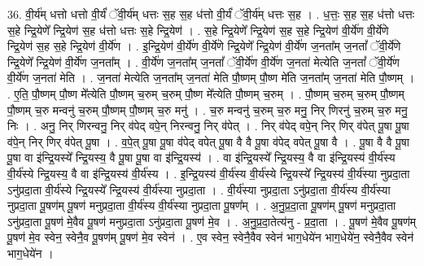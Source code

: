 \documentclass[17pt]{extarticle}
\begin{document}
36. वी॒र्य॑म् धत्तो धत्तो वी॒र्यं॑ ॅवी॒र्य॑म् धत्तः स॒ह स॒ह ध॑त्तो वी॒र्यं॑ ॅवी॒र्य॑म् धत्तः स॒ह । . ध॒त्तः॒ स॒ह स॒ह ध॑त्तो धत्तः स॒हे न्द्रि॒येणे᳚ न्द्रि॒येण॑ स॒ह ध॑त्तो धत्तः स॒हे न्द्रि॒येण॑ । . स॒हे न्द्रि॒येणे᳚ न्द्रि॒येण॑ स॒ह स॒हे न्द्रि॒येण॑ वी॒र्ये॑ण वी॒र्ये॑णे न्द्रि॒येण॑ स॒ह स॒हे न्द्रि॒येण॑ वी॒र्ये॑ण । . इ॒न्द्रि॒येण॑ वी॒र्ये॑ण वी॒र्ये॑णे न्द्रि॒येणे᳚ न्द्रि॒येण॑ वी॒र्ये॑ण ज॒नता᳚म् ज॒नतां᳚ ॅवी॒र्ये॑णे न्द्रि॒येणे᳚ न्द्रि॒येण॑ वी॒र्ये॑ण ज॒नता᳚म् । . वी॒र्ये॑ण ज॒नता᳚म् ज॒नतां᳚ ॅवी॒र्ये॑ण वी॒र्ये॑ण ज॒नता॑ मेत्येति ज॒नतां᳚ ॅवी॒र्ये॑ण वी॒र्ये॑ण ज॒नता॑ मेति । . ज॒नता॑ मेत्येति ज॒नता᳚म् ज॒नता॑ मेति पौ॒ष्णम् पौ॒ष्ण मे॑ति ज॒नता᳚म् ज॒नता॑ मेति पौ॒ष्णम् । . ए॒ति॒ पौ॒ष्णम् पौ॒ष्ण मे᳚त्येति पौ॒ष्णम् च॒रुम् च॒रुम् पौ॒ष्ण मे᳚त्येति पौ॒ष्णम् च॒रुम् । . पौ॒ष्णम् च॒रुम् च॒रुम् पौ॒ष्णम् पौ॒ष्णम् च॒रु मन्वनु॑ च॒रुम् पौ॒ष्णम् पौ॒ष्णम् च॒रु मनु॑ । . च॒रु मन्वनु॑ च॒रुम् च॒रु मनु॒ निर् णिरनु॑ च॒रुम् च॒रु मनु॒ निः । . अनु॒ निर् णिरन्वनु॒ निर् व॑पेद् वपे॒न् निरन्वनु॒ निर् व॑पेत् । . निर् व॑पेद् वपे॒न् निर् णिर् व॑पेत् पू॒षा पू॒षा व॑पे॒न् निर् णिर् व॑पेत् पू॒षा । . व॒पे॒त् पू॒षा पू॒षा व॑पेद् वपेत् पू॒षा वै वै पू॒षा व॑पेद् वपेत् पू॒षा वै । . पू॒षा वै वै पू॒षा पू॒षा वा इ॑न्द्रि॒यस्ये᳚ न्द्रि॒यस्य॒ वै पू॒षा पू॒षा वा इ॑न्द्रि॒यस्य॑ । . वा इ॑न्द्रि॒यस्ये᳚ न्द्रि॒यस्य॒ वै वा इ॑न्द्रि॒यस्य॑ वी॒र्य॑स्य वी॒र्य॑स्ये न्द्रि॒यस्य॒ वै वा इ॑न्द्रि॒यस्य॑ वी॒र्य॑स्य । . इ॒न्द्रि॒यस्य॑ वी॒र्य॑स्य वी॒र्य॑स्ये न्द्रि॒यस्ये᳚ न्द्रि॒यस्य॑ वी॒र्य॑स्या नुप्रदा॒ता ऽनु॑प्रदा॒ता वी॒र्य॑स्ये न्द्रि॒यस्ये᳚ न्द्रि॒यस्य॑ वी॒र्य॑स्या नुप्रदा॒ता । . वी॒र्य॑स्या नुप्रदा॒ता ऽनु॑प्रदा॒ता वी॒र्य॑स्य वी॒र्य॑स्या नुप्रदा॒ता पू॒षण॑म् पू॒षण॑ मनुप्रदा॒ता वी॒र्य॑स्य वी॒र्य॑स्या नुप्रदा॒ता पू॒षण᳚म् । . अ॒नु॒प्र॒दा॒ता पू॒षण॑म् पू॒षण॑ मनुप्रदा॒ता ऽनु॑प्रदा॒ता पू॒षण॑ मे॒वैव पू॒षण॑ मनुप्रदा॒ता ऽनु॑प्रदा॒ता पू॒षण॑ मे॒व । . अ॒नु॒प्र॒दा॒तेत्य॑नु - प्र॒दा॒ता । . पू॒षण॑ मे॒वैव पू॒षण॑म् पू॒षण॑ मे॒व स्वेन॒ स्वेनै॒व पू॒षण॑म् पू॒षण॑ मे॒व स्वेन॑ । . ए॒व स्वेन॒ स्वेनै॒वैव स्वेन॑ भाग॒धेये॑न भाग॒धेये॑न॒ स्वेनै॒वैव स्वेन॑ भाग॒धेये॑न । \newline
\pagebreak
{}
\end{document}
